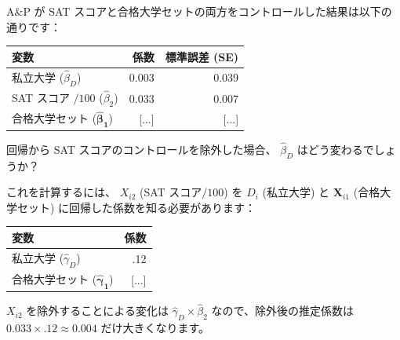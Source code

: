 \documentclass[11pt,handout]{beamer}
\newenvironment{wideitemize}{\itemize\addtolength{\itemsep}{10pt}}{\enditemize}
\begin{document}
\begin{frame}
	\begin{wideitemize}
	\item
	A\&P が SAT スコアと合格大学セットの両方をコントロールした結果は以下の通りです： \bigskip
	\begin{tabular}{lrr}
		変数 & 係数 & 標準誤差 (SE) \\ \hline
		私立大学 ($\hat\beta_D$) & 0.003 & 0.039 \\
		SAT スコア $/ 100$ ($\hat\beta_2$) & 0.033 & 0.007 \\
		合格大学セット ($\bm{\hat\beta_1}$) & [...] & [...]
	\end{tabular}

	\item
	回帰から SAT スコアのコントロールを除外した場合、 $\hat\beta_D$ はどう変わるでしょうか？
	
	\pause
	\item
	これを計算するには、 $X_{i2}$ (SAT スコア$/100$) を $D_i$ (私立大学) と $\bm{X}_{i1}$ (合格大学セット) に回帰した係数を知る必要があります： \\
	\pause
	\begin{tabular}{lr}
		変数 & 係数 \\ \hline
		私立大学 ($\hat\gamma_D$) & .12 \\
		合格大学セット ($\bm{\hat\gamma_1}$) & [...]
	\end{tabular}

	\pause
	\item 
	$X_{i2}$ を除外することによる変化は $\hat\gamma_D \times \hat\beta_2$ なので、除外後の推定係数は \pause $0.033 \times .12 \approx 0.004$ だけ大きくなります。
	\end{wideitemize}
\end{frame}
\end{document}
